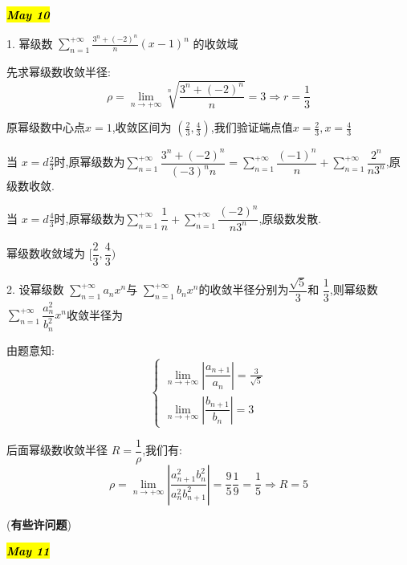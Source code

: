 
\hl{\textbf{\textit{May 10}}}

1. 幂级数 $\sum\limits_{n=1}^{+\infty}\frac{3^n+(-2)^n}{n}(x-1)^n$ 的收敛域
\begin{solution}
	
	先求幂级数收敛半径: 
	$$\rho=\lim\limits_{n\rightarrow +\infty}\sqrt[n]{\frac{3^n+(-2)^n}{n}}=3\Rightarrow r=\frac{1}{3}$$
	
	原幂级数中心点$x=1$,收敛区间为 $(\frac{2}{3},\frac{4}{3})$,我们验证端点值$x=\frac{2}{3},x=\frac{4}{3}$
	
	当 $x=d\frac{2}{3}$时,原幂级数为$\sum\limits_{n=1}^{+\infty}\dfrac{3^n+(-2)^{n}}{(-3)^{n}n}=\sum\limits_{n=1}^{+\infty}\dfrac{(-1)^n}{n}+\sum\limits_{n=1}^{+\infty}\dfrac{2^n}{n3^n}$,原级数收敛.
	
	当 $x=d\frac{4}{3}$时,原幂级数为$\sum\limits_{n=1}^{+\infty}\dfrac{1}{n}+\sum\limits_{n=1}^{+\infty}\dfrac{(-2)^n}{n3^n}$,原级数发散.
	
	幂级数收敛域为 $[\dfrac{2}{3},\dfrac{4}{3})$
\end{solution}


2. 设幂级数 $\sum\limits_{n=1}^{+\infty}a_{n}x^{n}$与 $\sum\limits_{n=1}^{+\infty}b_{n}x^{n}$的收敛半径分别为$\dfrac{\sqrt{5}}{3}$和 $\dfrac{1}{3}$,则幂级数 $\sum\limits_{n=1}^{+\infty}\dfrac{a_{n}^{2}}{b_{n}^{2}}x^{n}$收敛半径为
\begin{solution}
	由题意知: 
	$$\left\lbrace 
	\begin{array}{l}
		\lim\limits_{n\rightarrow+\infty}|\dfrac{a_{n+1}}{a_{n}}|=\frac{3}{\sqrt{5}}\\
		\lim\limits_{n\rightarrow+\infty}|\dfrac{b_{n+1}}{b_{n}}|=3
	\end{array}
	\right. $$
	
	后面幂级数收敛半径 $R=\dfrac{1}{\rho}$,我们有: 
	$$\rho=\lim\limits_{n\rightarrow+\infty}|\frac{a^{2}_{n+1}b_{n}^{2}}{a^{2}_{n}b_{n+1}^{2}}|=\frac{9}{5}\frac{1}{9}=\frac{1}{5}\Rightarrow R=5$$
	
	(\textbf{有些许问题})
\end{solution}


\hl{\textbf{\textit{May 11}}}

